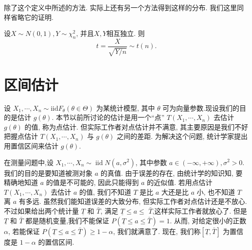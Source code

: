 除了这个定义中所述的方法. 实际上还有另一个方法得到这样的分布. 我们这里同样省略它的证明. 

\begin{theorem}
    设$X\sim N(0, 1), Y\sim \chi^2_n$, 并且$X, Y$相互独立. 则
    $$
    t=\frac{X}{\sqrt{Y/n}} \sim t(n).
    $$
\end{theorem}

\section{区间估计}

设 $X_1, \cdots, X_n \sim \mathrm{iid} F_\theta(\theta \in \Theta)$ 为某统计模型, 其中 $\theta$ 可为向量参数.现设我们的目的是估计 $g(\theta)$. 本节以前所讨论的估计是用一个``点'' $T\left(X_1, \cdots, X_n\right)$ 去估计 $g(\theta)$ 的值, 称为点估计. 但实际工作者对点估计并不满意, 其主要原因是我们不好把握点估计 $T\left(X_1, \cdots, X_n\right)$ 与 $g(\theta)$ 之间的差距. 为解决这个问题, 统计学家提出用置信区间来估计 $g(\theta)$. 

\begin{example}
    在测量问题中,设 $X_1, \cdots, X_n \sim \operatorname{iid} N\left(a, \sigma^2\right)$, 其中参数 $a \in(-\infty,+\infty), \sigma^2>0$. 我们的目的是要知道被测对象 $a$ 的真值. 由于误差的存在, 由统计学的知识知, 要精确地知道 $a$ 的值是不可能的, 因此只能得到 $a$ 的近似值. 若用点估计 $T\left(X_1, \cdots, X_n\right)$ 去估计 $a$ 的值, 我们不知道 $T$ 是比 $a$ 大还是比 $a$ 小, 也不知道 $T$ 离 $a$ 有多远. 虽然我们能知道误差的大致分布, 但实际工作者对点估计还是不放心. 不过如果给出两个统计量 $\underline T$ 和 $\bar{T}$, 满足 $\underline T \leq a \leq$ $\bar{T}$,这样实际工作者就放心了. 但是 $\underline{T}$ 和 $\bar{T}$ 都是随机变量,我们不能保证 $P(\underline{T} \leq a \leq \bar{T})=1$. 从而, 对给定很小的正数 $\alpha$, 若能保证 $P(\underline{T} \leq a \leq \bar T)\geq 1-\alpha $, 我们就满意了. 现在, 我们称$[\underline T, \bar{T}]$ 为置信度是 $1-\alpha$ 的置信区间.
\end{example}

